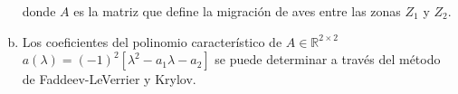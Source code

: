 \begin{frame}
\begin{solution}
\begin{enumerate}[a)]
			      donde $A$ es la matriz que define la migración de aves
			      entre las zonas $Z_{1}$ y $Z_{2}$.

			\item

			      Los coeficientes del polinomio característico de
			      $A\in\mathbb{R}^{2\times 2}$
			      \begin{math}
				      a\left(\lambda\right)=
				      \left(-1\right)^{2}
				      \left[\lambda^{2}-a_{1}\lambda-a_{2}\right]
			      \end{math}
			      se puede determinar a través del método de
			      Faddeev-LeVerrier y Krylov.
		\end{enumerate}
	\end{solution}
\end{frame}


